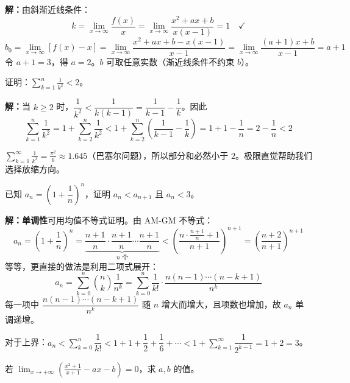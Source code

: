 \documentclass[12pt, a4paper]{ctexart}
\begin{document}
\textbf{解：}由斜渐近线条件：
\[
k = \lim_{x \to \infty} \frac{f(x)}{x} = \lim_{x \to \infty} \frac{x^2 + ax + b}{x(x-1)} = 1 \quad \checkmark
\]
\[
b_0 = \lim_{x \to \infty} [f(x) - x] = \lim_{x \to \infty} \frac{x^2 + ax + b - x(x-1)}{x - 1} = \lim_{x \to \infty} \frac{(a+1)x + b}{x - 1} = a + 1
\]
令 $a + 1 = 3$，得 $a = 2$。$b$ 可取任意实数（渐近线条件不约束 $b$）。

\begin{examplebox}[【例题7】极限与不等式放缩]
证明：$\displaystyle\sum_{k=1}^{n} \frac{1}{k^2} < 2$。
\end{examplebox}

\textbf{解：}当 $k \geq 2$ 时，$\dfrac{1}{k^2} < \dfrac{1}{k(k-1)} = \dfrac{1}{k-1} - \dfrac{1}{k}$。因此
\[
\sum_{k=1}^{n} \frac{1}{k^2} = 1 + \sum_{k=2}^{n} \frac{1}{k^2} < 1 + \sum_{k=2}^{n} \left(\frac{1}{k-1} - \frac{1}{k}\right) = 1 + 1 - \frac{1}{n} = 2 - \frac{1}{n} < 2
\]

\begin{tipbox}[极限视角]
$\displaystyle\sum_{k=1}^{\infty} \frac{1}{k^2} = \frac{\pi^2}{6} \approx 1.645$（巴塞尔问题），所以部分和必然小于 $2$。极限直觉帮助我们选择放缩方向。
\end{tipbox}

\begin{examplebox}[【例题8】极限思想解决数列不等式]
已知 $a_n = \left(1 + \dfrac{1}{n}\right)^n$，证明 $a_n < a_{n+1}$ 且 $a_n < 3$。
\end{examplebox}

\textbf{解：}\textbf{单调性}可用均值不等式证明。由 AM-GM 不等式：
\[
a_n = \left(1 + \frac{1}{n}\right)^n = \underbrace{\frac{n+1}{n} \cdot \frac{n+1}{n} \cdots \frac{n+1}{n}}_{n \text{ 个}} < \left(\frac{n \cdot \frac{n+1}{n} + 1}{n+1}\right)^{n+1} = \left(\frac{n+2}{n+1}\right)^{n+1}
\]
等等，更直接的做法是利用二项式展开：
\[
a_n = \sum_{k=0}^{n} \binom{n}{k} \frac{1}{n^k} = \sum_{k=0}^{n} \frac{1}{k!} \cdot \frac{n(n-1)\cdots(n-k+1)}{n^k}
\]
每一项中 $\dfrac{n(n-1)\cdots(n-k+1)}{n^k}$ 随 $n$ 增大而增大，且项数也增加，故 $a_n$ 单调递增。

对于上界：$a_n < \displaystyle\sum_{k=0}^{n} \dfrac{1}{k!} < 1 + 1 + \dfrac{1}{2} + \dfrac{1}{6} + \cdots < 1 + \displaystyle\sum_{k=1}^{\infty} \dfrac{1}{2^{k-1}} = 1 + 2 = 3$。

\begin{examplebox}[【例题9】极限在参数范围中的应用]
若 $\displaystyle\lim_{x \to +\infty} \left(\frac{x^2 + 1}{x + 1} - ax - b\right) = 0$，求 $a, b$ 的值。
\end{examplebox}
\end{document}
